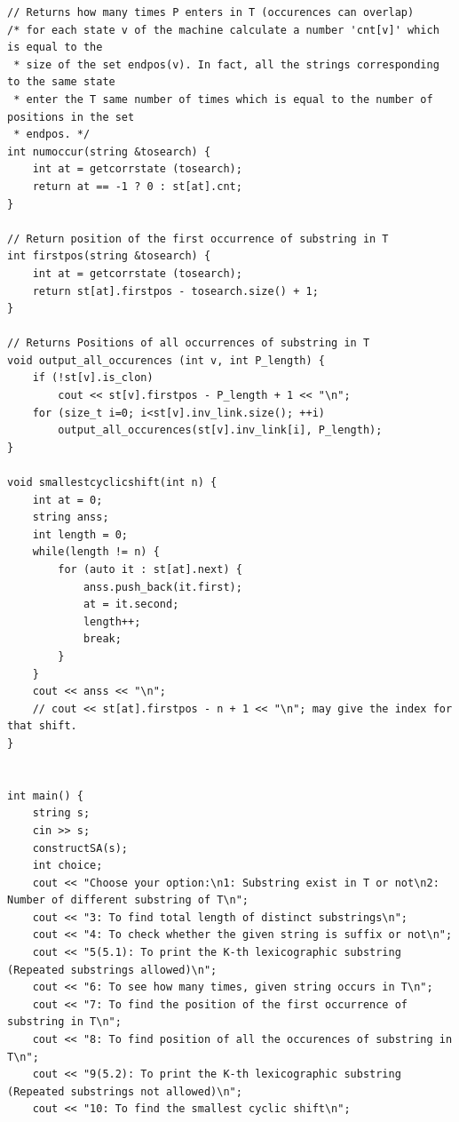 \documentclass[8pt, a4paper, oneside, twocolumn]{extarticle}
\begin{document}
\begin{verbatim}
// Returns how many times P enters in T (occurences can overlap)
/* for each state v of the machine calculate a number 'cnt[v]' which is equal to the
 * size of the set endpos(v). In fact, all the strings corresponding to the same state
 * enter the T same number of times which is equal to the number of positions in the set
 * endpos. */
int numoccur(string &tosearch) {
    int at = getcorrstate (tosearch);
    return at == -1 ? 0 : st[at].cnt;
}

// Return position of the first occurrence of substring in T
int firstpos(string &tosearch) {
    int at = getcorrstate (tosearch);
    return st[at].firstpos - tosearch.size() + 1;
}

// Returns Positions of all occurrences of substring in T
void output_all_occurences (int v, int P_length) {
    if (!st[v].is_clon)
        cout << st[v].firstpos - P_length + 1 << "\n";
    for (size_t i=0; i<st[v].inv_link.size(); ++i)
        output_all_occurences(st[v].inv_link[i], P_length);
}

void smallestcyclicshift(int n) {
    int at = 0;
    string anss;
    int length = 0;
    while(length != n) {
        for (auto it : st[at].next) {
            anss.push_back(it.first);
            at = it.second;
            length++;
            break;
        }
    }
    cout << anss << "\n";
    // cout << st[at].firstpos - n + 1 << "\n"; may give the index for that shift.
}


int main() {
    string s;
    cin >> s;
    constructSA(s);
    int choice;
    cout << "Choose your option:\n1: Substring exist in T or not\n2: Number of different substring of T\n";
    cout << "3: To find total length of distinct substrings\n";
    cout << "4: To check whether the given string is suffix or not\n";
    cout << "5(5.1): To print the K-th lexicographic substring (Repeated substrings allowed)\n";
    cout << "6: To see how many times, given string occurs in T\n";
    cout << "7: To find the position of the first occurrence of substring in T\n";
    cout << "8: To find position of all the occurences of substring in T\n";
    cout << "9(5.2): To print the K-th lexicographic substring (Repeated substrings not allowed)\n";
    cout << "10: To find the smallest cyclic shift\n";


\end{verbatim}
\end{document}
